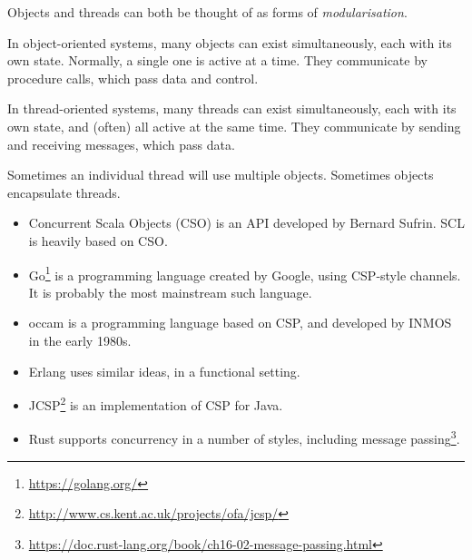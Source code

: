 \documentclass[notes,color]{sepslide0}
\begin{document}

\begin{slide}

Objects and threads can both be thought of as forms of
\emph{modularisation}. 

In object-oriented systems, many objects can exist simultaneously, each with
its own state.  Normally, a single one is active at a time.  They communicate
by procedure calls, which pass data and control.

In thread-oriented systems, many threads can exist simultaneously, each
with its own state, and (often) all active at the same time.  They communicate
by sending and receiving messages, which pass data.

Sometimes an individual thread will use multiple objects.  Sometimes objects
encapsulate threads.
\end{slide}


\begin{slide}

\begin{itemize}
\item Concurrent Scala Objects (CSO) is an API developed by Bernard Sufrin.
  SCL is heavily based on CSO.

\item Go\footnote{\url{https://golang.org/}} is a programming language created
by Google, using CSP-style channels.  It is probably the most
mainstream such language.

\item
{\sf occam} is a programming language based on CSP, and developed by INMOS in
the early 1980s.

\item Erlang uses similar ideas, in a functional setting.

\item JCSP\footnote{\url{http://www.cs.kent.ac.uk/projects/ofa/jcsp/}} is an
implementation of CSP for Java.



\item Rust supports concurrency in a number of styles, including message
  passing\footnote{%
    \url{https://doc.rust-lang.org/book/ch16-02-message-passing.html}}. 

\end{itemize}
\vfill
\end{slide}
\end{document}
